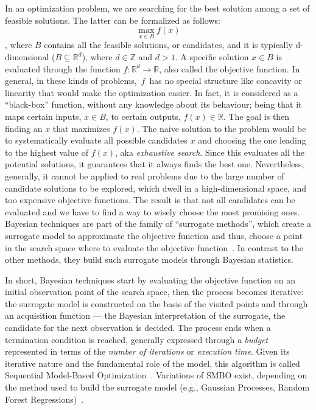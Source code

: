 In an optimization problem, we are searching for the best solution among a set of feasible solutions. The latter can be formalized as follows:
\begin{equation*}
    \max_{x \in B} f ( x )
\end{equation*}
, where $B$ contains all the feasible solutions, or candidates, and it is typically d-dimensional ($B \subseteq \mathbb{R}^d$), where $d \in \mathbb{Z}$ and $d>1$. A specific solution $x \in B$ is evaluated through the function $f: \mathbb{R}^d \longrightarrow \mathbb{R}$, also called the objective function. In general, in these kinds of problems,~$f$~has no special structure like concavity or linearity that would make the optimization easier. In fact, it is considered as a ``black-box'' function, without any knowledge about its behaviour; being that it maps certain inputs, $x \in B$, to certain outputs, $f(x) \in \mathbb{R}$. The goal is then finding an $x$ that maximizes $f(x)$.
The naive solution to the problem would be to systematically evaluate all possible candidates $x$ and choosing the one leading to the highest value of $f(x)$, aka \textit{exhaustive search}. Since this evaluates all the potential solutions, it guarantees that it always finds the best one. Nevertheless, generally, it cannot be applied to real problems due to the large number of candidate solutions to be explored, which dwell in a high-dimensional space, and too expensive objective functions. The result is that not all candidates can be evaluated and we have to find a way to wisely choose the most promising ones.
Bayesian techniques are part of the family of ``surrogate methods'', which create a surrogate model to approximate the objective function and thus, choose a point in the search space where to evaluate the objective function~\cite{BayesianOptimizationBook}. In contrast to the other methods, they build such surrogate models through Bayesian statistics.

In short, Bayesian techniques start by evaluating the objective function on an initial observation point of the search space, then the process becomes iterative: the surrogate model is constructed on the basis of the visited points and through an acquisition function --- the Bayesian interpretation of the surrogate, the candidate for the next observation is decided. The process ends when a termination condition is reached, generally expressed through a \textit{budget} represented in terms of the \textit{number of iterations} or \textit{execution time}. Given its iterative nature and the fundamental role of the model, this algorithm is called Sequential Model-Based Optimization~\citep{hutter2011sequential,hutter2009experimental}. 
Variations of SMBO exist, depending on the method used to build the surrogate model (e.g., Gaussian Processes, Random Forest Regressions)~\cite{snoeck2012NIPS,Wistuba2018ML}.

